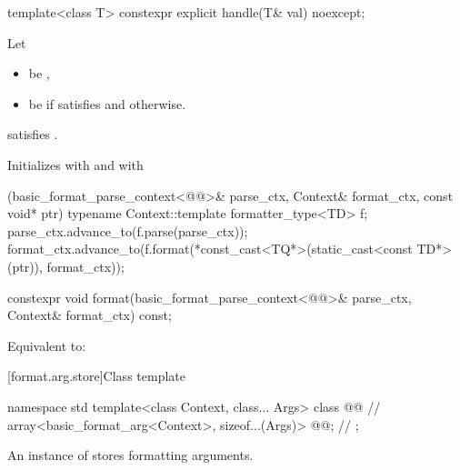 %
\begin{itemdecl}
template<class T> constexpr explicit handle(T& val) noexcept;
\end{itemdecl}

\begin{itemdescr}
\pnum
Let
\begin{itemize}
\item
{} be ,
\item
{} be  if
 satisfies 
and  otherwise.
\end{itemize}

\pnum
\mandates
{} satisfies .

\pnum
\effects
Initializes
 with  and
 with
\begin{codeblock}
[](basic_format_parse_context<@@>& parse_ctx,
   Context& format_ctx, const void* ptr) {
  typename Context::template formatter_type<TD> f;
  parse_ctx.advance_to(f.parse(parse_ctx));
  format_ctx.advance_to(f.format(*const_cast<TQ*>(static_cast<const TD*>(ptr)),
                                 format_ctx));
}
\end{codeblock}
\end{itemdescr}

%
\begin{itemdecl}
constexpr void format(basic_format_parse_context<@@>& parse_ctx, Context& format_ctx) const;
\end{itemdecl}

\begin{itemdescr}
\pnum
\effects
Equivalent to: 
\end{itemdescr}

[format.arg.store]{Class template }

\begin{codeblock}
namespace std {
  template<class Context, class... Args>
  class @@ {                                      // \expos
    array<basic_format_arg<Context>, sizeof...(Args)> @@;     // \expos
  };
}
\end{codeblock}

\pnum
An instance of  stores formatting arguments.

